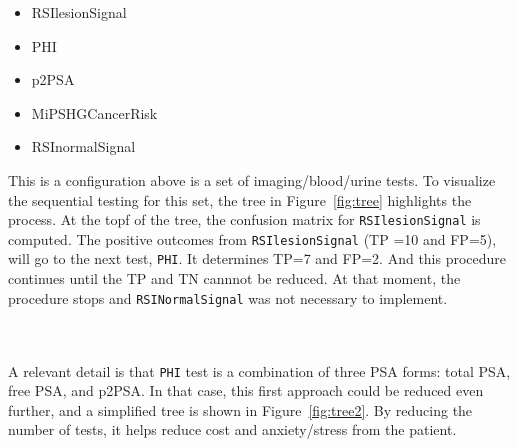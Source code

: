 \documentclass[]{article}
\begin{document}
\begin{itemize}
  \item RSIlesionSignal 
  \item PHI 
  \item p2PSA 
  \item MiPSHGCancerRisk 
  \item RSInormalSignal 
\end{itemize}

\noindent This is a configuration above is a set of imaging/blood/urine tests. 
To visualize the sequential testing for this set, the tree in Figure~\ref{fig:tree} 
highlights the process. At the topf of the tree, the confusion matrix for \verb|RSIlesionSignal|
is computed. The positive outcomes from  \verb|RSIlesionSignal| 
(TP =10 and FP=5), will go to the next test, \verb|PHI|. It determines TP=7 and FP=2. And this  
procedure continues until the TP and TN cannnot be reduced.  At that moment, the procedure 
stops and \verb|RSINormalSignal| was not necessary to implement.  \\

\begin{minipage}{\linewidth}
\label{fig:tree}
\end{minipage} \\
\\
\noindent A relevant detail is that {\verb|PHI|} test is a combination of three PSA forms: total PSA, 
free PSA, and p2PSA. In that case, this first approach could be reduced even further, and a simplified 
tree is shown in Figure~\ref{fig:tree2}. By reducing the number of tests, it helps reduce cost and 
anxiety/stress from the patient.  \\
\\
\begin{minipage}{\linewidth}
\label{fig:tree2}
\end{minipage} \\
\end{document}
